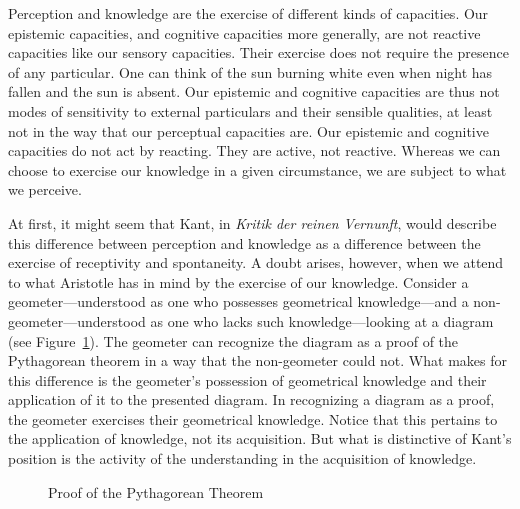 Perception and knowledge are the exercise of different kinds of capacities. Our epistemic capacities, and cognitive capacities more generally, are not reactive capacities like our sensory capacities. Their exercise does not require the presence of any particular. One can think of the sun burning white even when night has fallen and the sun is absent. Our epistemic and cognitive capacities are thus not modes of sensitivity to external particulars and their sensible qualities, at least not in the way that our perceptual capacities are. Our epistemic and cognitive capacities do not act by reacting. They are active, not reactive. Whereas we can choose to exercise our knowledge in a given circumstance, we are subject to what we perceive.

At first, it might seem that Kant, in \emph{Kritik der reinen Vernunft}, would describe this difference between perception and knowledge as a difference between the exercise of receptivity and spontaneity. A doubt arises, however, when we attend to what Aristotle has in mind by the exercise of our knowledge. Consider a geometer---understood as one who possesses geometrical knowledge---and a non-geo\-me\-ter\----understood as one who lacks such knowledge---looking at a diagram (see Figure~\ref{fig:1.5}). The geometer can recognize the diagram as a proof of the Pythagorean theorem in a way that the non-geometer could not. What makes for this difference is the geometer's possession of geometrical knowledge and their application of it to the presented diagram. In recognizing a diagram as a proof, the geometer exercises their geometrical knowledge. Notice that this pertains to the application of knowledge, not its acquisition. But what is distinctive of Kant's position is the activity of the understanding in the acquisition of knowledge. 
\begin{figure}[htbp]
    \begin{center}
	\end{center}
	\caption{Proof of the Pythagorean Theorem}
    \label{fig:1.5}
\end{figure}

